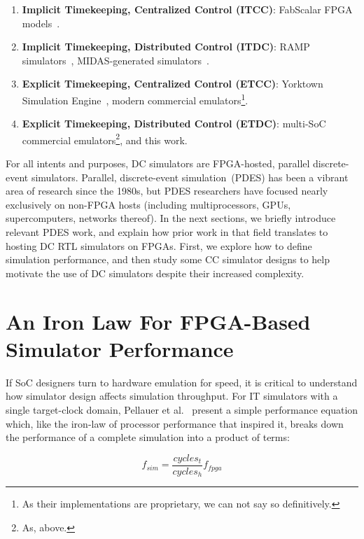 \begin{enumerate}
\item\textbf{Implicit Timekeeping, Centralized Control (ITCC)}: FabScalar FPGA models~\cite{fabscalarfpga}.

\item\textbf{Implicit Timekeeping, Distributed Control (ITDC)}: RAMP simulators~\cite{RAMPGold, HASim}, MIDAS-generated simulators~\cite{FireSim}.

\item\textbf{Explicit Timekeeping, Centralized Control (ETCC)}: Yorktown Simulation Engine~\cite{YSESoftware}, modern commercial emulators\footnote{As their implementations are proprietary, we can not say so definitively.}.

\item\textbf{Explicit Timekeeping, Distributed Control (ETDC)}: multi-SoC commercial emulators\footnote{As, above.}, and this work.
\end{enumerate}

For all intents and purposes, DC simulators are FPGA-hosted, parallel
discrete-event simulators.  Parallel, discrete-event simulation~(PDES) has been
a vibrant area of research since the 1980s, but PDES researchers have focused
nearly exclusively on non-FPGA hosts (including multiprocessors, GPUs,
supercomputers, networks thereof).  In the next sections, we briefly introduce
relevant PDES work, and explain how prior work in that field translates to
hosting DC RTL simulators on FPGAs. First, we explore how to define simulation
performance, and then study some CC simulator designs to help motivate the use
of DC simulators despite their increased complexity.

\section{An Iron Law For FPGA-Based Simulator Performance}\label{sec:iron-law}

If SoC designers turn to hardware emulation for speed, it is critical
to understand how simulator design affects simulation throughput. For IT simulators with a single target-clock domain, Pellauer et al.~\cite{APortNetworks} present a simple performance
equation which, like the iron-law of processor performance that inspired it,
breaks down the performance of a complete simulation into a product of terms:

\begin{equation}
    f_{sim} = \frac{cycles_{t}}{cycles_{h}} f_{fpga}
\end{equation}\label{eq:sim-perf}

